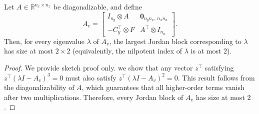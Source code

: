 \begin{lemma}\label{lm::Avindex2}
Let $A \in \mathbb{R}^{n_x \times n_x}$ be diagonalizable, and define
\[
A_v =
\begin{bmatrix}
I_{n_y} \otimes A & \mathbf{0}_{n_y n_x,\, n_x n_u} \\
- C_y^\top \otimes F & A^\top \otimes I_{n_u}
\end{bmatrix}.
\]
Then, for every eigenvalue $\lambda$ of $A_v$, the largest Jordan block corresponding to $\lambda$ has size at most $2 \times 2$ (equivalently, the nilpotent index of $\lambda$ is at most $2$).
\end{lemma}
\begin{proof}
We provide sketch proof only. 
we show that any vector \(z^\top\) satisfying \(z^\top(\lambda I - A_v)^3 = 0\) must also satisfy \(z^\top(\lambda I - A_v)^2 = 0\). 
This result follows from the diagonalizability of \(A\), which guarantees that all higher-order terms vanish after two multiplications. 
Therefore, every Jordan block of \(A_v\) has size at most \(2\).
\end{proof}

